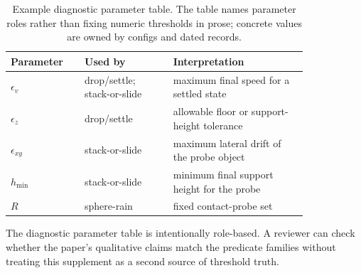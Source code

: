 \begin{table}[t]
\centering
\small
\caption{Example diagnostic parameter table. The table names parameter roles rather than fixing
numeric thresholds in prose; concrete values are owned by configs and dated records.}
\label{tab:supp-diagnostic-parameters}
\begin{tabular}{p{0.2\linewidth}p{0.25\linewidth}p{0.38\linewidth}}
\toprule
Parameter & Used by & Interpretation \\
\midrule
$\epsilon_v$ & drop/settle; stack-or-slide & maximum final speed for a settled state \\
$\epsilon_z$ & drop/settle & allowable floor or support-height tolerance \\
$\epsilon_{xy}$ & stack-or-slide & maximum lateral drift of the probe object \\
$h_{\min}$ & stack-or-slide & minimum final support height for the probe \\
$R$ & sphere-rain & fixed contact-probe set \\
\bottomrule
\end{tabular}
\end{table}

The diagnostic parameter table is intentionally role-based. A reviewer can check whether the
paper's qualitative claims match the predicate families without treating this supplement as a
second source of threshold truth.
